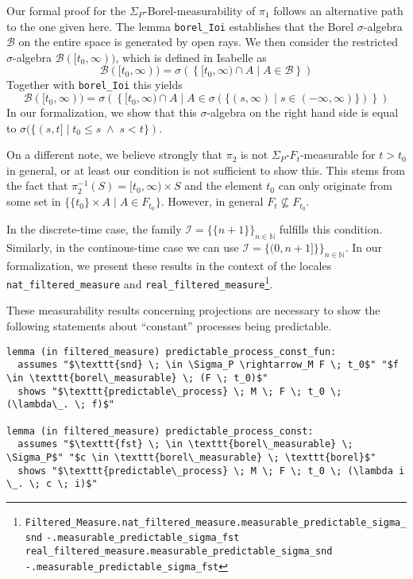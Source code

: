 \begin{remark}
	Our formal proof for the $\Sigma_P$-Borel-measurability of $\pi_1$ follows an alternative path to the one given here. The lemma \texttt{borel\_Ioi} establishes that the Borel $\sigma$-algebra  $\mathcal{B}$ on the entire space is generated by open rays. We then consider the restricted $\sigma$-algebra $\mathcal{B}([t_0,\infty))$, which is defined in Isabelle as
	\[
		\mathcal{B}([t_0,\infty)) = \sigma\left(\left\{[t_0, \infty) \cap A \;\vert\; A \in \mathcal{B}\right\}\right)
	\]
	Together with \texttt{borel\_Ioi} this yields
	\[
	 	\mathcal{B}([t_0,\infty)) = \sigma\left(\left\{[t_0, \infty) \cap A \;\vert\; A \in \sigma(\{(s,\infty) \;\vert\; s \in (-\infty,\infty)\})\right\}\right)
	\]
	In our formalization, we show that this $\sigma$-algebra on the right hand side is equal to $\sigma(\{(s,t] \;\vert\; t_0 \le s \;\wedge\; s < t\})$.
	
	On a different note, we believe strongly that $\pi_2$ is not $\Sigma_P$-$F_t$-measurable for $t > t_0$ in general, or at least our condition is not sufficient to show this. This stems from the fact that $\pi_2^{-1}(S) = [t_0, \infty) \times S$ and the element $t_0$ can only originate from some set in $\{\{t_0\} \times A \;\vert\; A \in F_{t_0}\}$. However, in general $F_t \not\subseteq F_{t_0}$.
\end{remark}

In the discrete-time case, the family $\mathcal{I} = \{\{n + 1\}\}_{n \in \mathbb{N}}$ fulfills this condition. Similarly, in the continous-time case we can use $\mathcal{I} = \{(0,n + 1]\}\}_{n \in \mathbb{N}}$. In our formalization, we present these results in the context of the locales \texttt{nat\_filtered\_measure} and \texttt{real\_filtered\_measure}\footnote{\texttt{Filtered\_Measure.nat\_filtered\_measure.measurable\_predictable\_sigma\_snd} \quad \texttt{-.measurable\_predictable\_sigma\_fst} \\\texttt{real\_filtered\_measure.measurable\_predictable\_sigma\_snd} \quad \texttt{-.measurable\_predictable\_sigma\_fst}}.

These measurability results concerning projections are necessary to show the following statements about ``constant'' processes being predictable.

\begin{isalemma}
{\small
\begin{lstlisting}[style=isabelle]
lemma (in filtered_measure) predictable_process_const_fun:
  assumes "$\texttt{snd} \; \in \Sigma_P \rightarrow_M F \; t_0$" "$f \in \texttt{borel\_measurable} \; (F \; t_0)$"
  shows "$\texttt{predictable\_process} \; M \; F \; t_0 \; (\lambda\_. \; f)$"

lemma (in filtered_measure) predictable_process_const:
  assumes "$\texttt{fst} \; \in \texttt{borel\_measurable} \; \Sigma_P$" "$c \in \texttt{borel\_measurable} \; \texttt{borel}$"
  shows "$\texttt{predictable\_process} \; M \; F \; t_0 \; (\lambda i \_. \; c \; i)$"
\end{lstlisting}
}
\end{isalemma}

